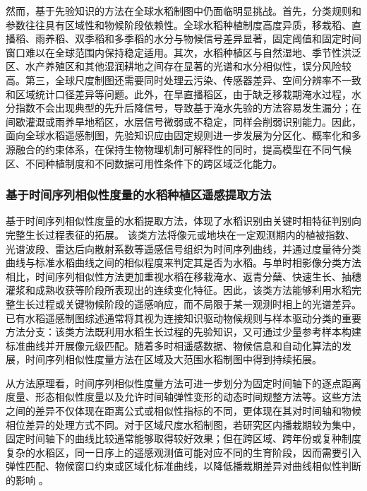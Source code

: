 然而，基于先验知识的方法在全球水稻制图中仍面临明显挑战。首先，分类规则和参数往往具有区域性和物候阶段依赖性\cite{Dong2016}。全球水稻种植制度高度异质，移栽稻、直播稻、雨养稻、双季稻和多季稻的水分与物候信号差异显著，固定阈值和固定时间窗口难以在全球范围内保持稳定适用\cite{Zhao2024OpticalRadar}。其次，水稻种植区与自然湿地、季节性洪泛区、水产养殖区和其他湿润耕地之间存在显著的光谱和水分相似性，误分风险较高。第三，全球尺度制图还需要同时处理云污染、传感器差异、空间分辨率不一致和区域统计口径差异等问题。此外，在旱直播稻区，由于缺乏移栽期淹水过程，水分指数不会出现典型的先升后降信号，导致基于淹水先验的方法容易发生漏分；在间歇灌溉或雨养旱地稻区，水层信号微弱或不稳定，同样会削弱识别能力。因此，面向全球水稻遥感制图，先验知识应由固定规则进一步发展为分区化、概率化和多源融合的约束体系，在保持生物物理机制可解释性的同时，提高模型在不同气候区、不同种植制度和不同数据可用性条件下的跨区域泛化能力。

\subsubsection{基于时间序列相似性度量的水稻种植区遥感提取方法}
\label{sec:curve_similarity_methods}

基于时间序列相似性度量的水稻提取方法，体现了水稻识别由关键时相特征判别向完整生长过程表征的拓展。
该类方法将像元或地块在一定观测期内的植被指数、光谱波段、雷达后向散射系数等遥感信号组织为时间序列曲线，并通过度量待分类曲线与标准水稻曲线之间的相似程度来判定其是否为水稻。与单时相影像分类方法相比，时间序列相似性方法更加重视水稻在移栽淹水、返青分蘖、快速生长、抽穗灌浆和成熟收获等阶段所表现出的连续变化特征。因此，该类方法能够利用水稻完整生长过程或关键物候阶段的遥感响应，而不局限于某一观测时相上的光谱差异。已有水稻遥感制图综述通常将其视为连接知识驱动物候规则与样本驱动分类的重要方法分支：该类方法既利用水稻生长过程的先验知识，又可通过少量参考样本构建标准曲线并开展像元级匹配\citep{Zhao2021Sustainability}。随着多时相遥感数据、物候信息和自动化算法的发展，时间序列相似性度量方法在区域及大范围水稻制图中得到持续拓展\citep{Dong2016,Zhao2021Sustainability}。

从方法原理看，时间序列相似性度量方法可进一步划分为固定时间轴下的逐点距离度量、形态相似性度量以及允许时间轴弹性变形的动态时间规整方法等。这些方法之间的差异不仅体现在距离公式或相似性指标的不同，更体现在其对时间轴和物候相位差异的处理方式不同。对于区域尺度水稻制图，若研究区内播栽期较为集中，固定时间轴下的曲线比较通常能够取得较好效果；但在跨区域、跨年份或复种制度复杂的水稻区，同一日序上的遥感观测值可能对应不同的生育阶段，因而需要引入弹性匹配、物候窗口约束或区域化标准曲线，以降低播栽期差异对曲线相似性判断的影响 \citep{Dong2016}。

